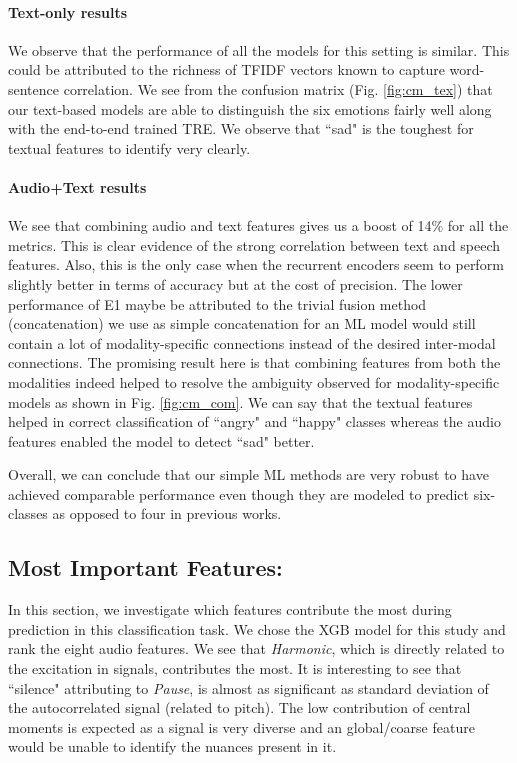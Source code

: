 \documentclass[conference]{IEEEtran}
\begin{document}
\paragraph{Text-only results} We observe that the performance of all the models for this setting is similar. This could be attributed to the richness of TFIDF vectors known to capture word-sentence correlation. We see from the confusion matrix (Fig. \ref{fig:cm_tex}) that our text-based models are able to distinguish the six emotions fairly well along with the end-to-end trained TRE. We observe that ``sad" is the toughest for textual features to identify very clearly.

\paragraph{Audio+Text results} We see that combining audio and text features gives us a boost of 14\% for all the metrics. This is clear evidence of the strong correlation between text and speech features. Also, this is the only case when the recurrent encoders seem to perform slightly better in terms of accuracy but at the cost of precision. The lower performance of E1 maybe be attributed to the trivial fusion method (concatenation) we use as simple concatenation for an ML model would still contain a lot of modality-specific connections instead of the desired inter-modal connections. The promising result here is that combining features from both the modalities indeed helped to resolve the ambiguity observed for modality-specific models as shown in Fig. \ref{fig:cm_com}. We can say that the textual features helped in correct classification of ``angry" and ``happy" classes whereas the audio features enabled the model to detect ``sad" better.

Overall, we can conclude that our simple ML methods are very robust to have achieved comparable performance even though they are modeled to predict six-classes as opposed to four in previous works.


\subsection{Most Important Features:}
In this section, we investigate which features contribute the most during prediction in this classification task. We chose the XGB model for this study and rank the eight audio features. We see that \textit{Harmonic}, which is directly related to the excitation in signals, contributes the most. It is interesting to see that ``silence" attributing to \textit{Pause}, is almost as significant as standard deviation of the autocorrelated signal (related to pitch). The low contribution of central moments is expected as a signal is very diverse and an global/coarse feature would be unable to identify the nuances present in it.
\end{document}
